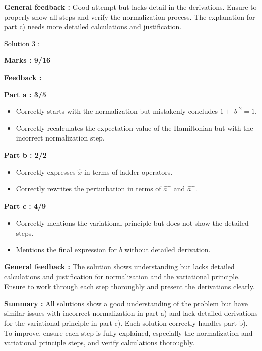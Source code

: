 \documentclass[a4paper,11pt]{article}
\begin{document}
\textbf{General feedback :}
Good attempt but lacks detail in the derivations. Ensure to properly show all steps and verify the normalization process. The explanation for part c) needs more detailed calculations and justification.



Solution 3 :

\textbf{Marks : 9/16}

\textbf{Feedback :}

\textbf{Part a : 3/5}

\begin{itemize}
    \item Correctly starts with the normalization but mistakenly concludes $1 + |b|^2 = 1$.
    \item Correctly recalculates the expectation value of the Hamiltonian but with the incorrect normalization step.
\end{itemize}

\textbf{Part b : 2/2}

\begin{itemize}
    \item Correctly expresses $\hat{x}$ in terms of ladder operators.
    \item Correctly rewrites the perturbation in terms of $\hat{a_+}$ and $\hat{a_-}$.
\end{itemize}

\textbf{Part c : 4/9}

\begin{itemize}
    \item Correctly mentions the variational principle but does not show the detailed steps.
    \item Mentions the final expression for $b$ without detailed derivation.
\end{itemize}

\textbf{General feedback :}
The solution shows understanding but lacks detailed calculations and justification for normalization and the variational principle. Ensure to work through each step thoroughly and present the derivations clearly.

\textbf{Summary :}
All solutions show a good understanding of the problem but have similar issues with incorrect normalization in part a) and lack detailed derivations for the variational principle in part c). Each solution correctly handles part b). To improve, ensure each step is fully explained, especially the normalization and variational principle steps, and verify calculations thoroughly.
\end{document}
